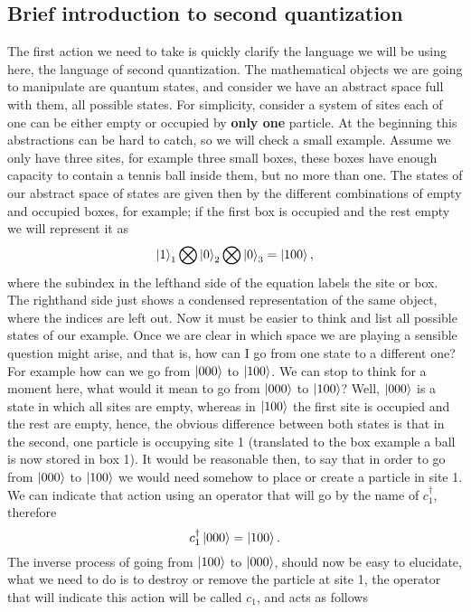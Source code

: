 \subsection{Brief introduction to second quantization}

The first action we need to take is quickly clarify the language we will be using here, the language of second quantization. The mathematical objects we are going to manipulate are quantum states, and consider we have an abstract space full with them, all possible states. For simplicity, consider a system of sites each of one can be either empty or occupied by \textbf{only one} particle. At the beginning this abstractions can be hard to catch, so we will check a small example. Assume we only have three sites, for example three small boxes, these boxes have enough capacity to contain a tennis ball inside them, but no more than one. The states of our abstract space of states are given then by the different combinations of empty and occupied boxes, for example; if the first box is occupied and the rest empty we will represent it as
\begin{equation*}
    \ket{1}_1\bigotimes\ket{0}_2\bigotimes\ket{0}_3 = \ket{100},
\end{equation*}
where the subindex in the lefthand side of the equation labels the site or box. The righthand side just shows a condensed representation of the same object, where the indices are left out. Now it must be easier to think and list all possible states of our example. Once we are clear in which space we are playing a sensible question might arise, and that is, how can I go from one state to a different one? For example how can we go from $\ket{000}$ to $\ket{100}$. We can stop to think for a moment here, what would it mean to go from $\ket{000}$ to $\ket{100}$? Well, $\ket{000}$ is a state in which all sites are empty, whereas in $\ket{100}$ the first site is occupied and the rest are empty, hence, the obvious difference between both states is that in the second, one particle is occupying site 1 (translated to the box example a ball is now stored in box 1). It would be reasonable then, to say that in order to go from $\ket{000}$ to $\ket{100}$ we would need somehow to place or create a particle in site 1. We can indicate that action using an operator that will go by the name of  $c_1^\dagger$, therefore
\begin{equation*}
    c_1^\dagger \ket{000} = \ket{100}.
\end{equation*}
The inverse process of going from $\ket{100}$ to $\ket{000}$, should now be easy to elucidate, what we need to do is to destroy or remove the particle at site 1, the operator that will indicate this action will be called $c_1$, and acts as follows
